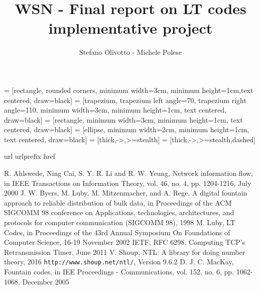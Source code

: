 \documentclass[12pt]{article}
\begin{document}
\title{WSN - Final report on LT codes implementative project}
\author{Stefano Olivotto - Michele Polese}
\maketitle

 = [rectangle, rounded corners, minimum width=3cm, minimum height=1cm,text centered, draw=black]
 = [trapezium, trapezium left angle=70, trapezium right angle=110, minimum width=3cm, minimum height=1cm, text centered, draw=black]
 = [rectangle, minimum width=3cm, minimum height=1cm, text centered, draw=black]
 = [ellipse, minimum width=2cm, minimum height=1cm, text centered, draw=black]
 = [thick,->,>=stealth]
 = [thick,->,>=stealth,dashed]








\begin{thebibliography}{10}
\expandafter\ifx\csname url\endcsname\relax
  \def\url#1{\texttt{#1}}\fi
\expandafter\ifx\csname urlprefix\endcsname\relax\def\urlprefix{URL }\fi
\expandafter\ifx\csname href\endcsname\relax
  \def\href#1#2{#2} \def\path#1{#1}\fi
  

  R. Ahlswede, Ning Cai, S. Y. R. Li and R. W. Yeung, Network information flow, in IEEE Transactions on Information Theory, vol. 46, no. 4, pp. 1204-1216, July 2000
 J. W. Byers, M. Luby, M. Mitzenmacher, and A. Rege, A digital fountain approach to reliable distribution of bulk data, in Proceedings of the ACM SIGCOMM 98 conference on Applications, technologies, architectures, and protocols for computer communication (SIGCOMM 98), 1998 
 M. Luby, LT Codes, in Proceedings of the 43rd Annual Symposium On Foundations of Computer Science, 16-19 November 2002
 IETF, RFC 6298, Computing TCP's Retransmission Timer, June 2011
 V. Shoup, NTL: A library for doing number theory, 2016 \url{http://www.shoup.net/ntl/}, Version 9.6.2
 D. J. C. MacKay, Fountain codes, in IEE Proceedings - Communications, vol. 152, no. 6, pp. 1062-1068, December 2005
\end{thebibliography}
\end{document}
